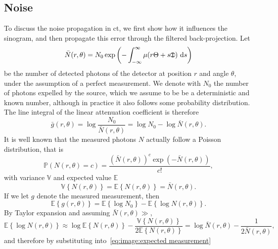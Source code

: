 \documentclass[../ml-ct.tex]{subfiles}
\begin{document}
\subsection{Noise}%
\label{ssec:image:artifacts:noise}
To discuss the noise propagation in \gls{ct}, we first show how it influences the sinogram, and then propagate this error through the filtered back-projection.
Let
\begin{equation}
	\bar{N}(r, \theta) = N_0 \exp{\left( -\int_{-\infty}^{\infty} \mu(r\tcs + s\tcsperp)\ \dd s \right)}
\end{equation}
be the number of detected photons of the detector at position \( r \) and angle \( \theta \), under the assumption of a perfect measurement.
We denote with \( N_0 \) the number of photons expelled by the source, which we assume to be be a deterministic and known number, although in practice it also follows some probability distribution.
The line integral of the linear attenuation coefficient is therefore
\begin{equation}
	\bar{g}(r, \theta) = \log \frac{N_0}{\bar{N}(r, \theta)} = \log N_0 - \log \bar{N}(r, \theta).
\end{equation}
It is well known that the measured photons \( N \) actually follow a Poisson distribution, that is
\begin{equation}
	\mathbb{P}(N(r, \theta) = c) = \frac{{(\bar{N}(r, \theta))}^c \exp{(-\bar{N}(r, \theta))}}{c!},
\end{equation}
with variance \( \mathbb{V} \) and expected value \( \mathbb{E} \)
\begin{equation}
	\mathbb{V}\left\{ N(r, \theta) \right\} = \mathbb{E}\left\{ N(r, \theta) \right\} = \bar{N}(r, \theta).
\end{equation}
If we let \( g \) denote the measured measurement, then
\begin{equation}
	\mathbb{E}\left\{ g(r, \theta) \right\} = \mathbb{E}\left\{ \log{N_0} \right\} - \mathbb{E}\left\{ \log{N(r, \theta)} \right\}.%
	\label{eq:image:expected measurement}
\end{equation}
By Taylor expansion and assuming \( \bar{N}(r, \theta ) \gg \),
\begin{equation}
	\mathbb{E} \left\{ \log{N(r, \theta)} \right\} \approx \log \mathbb{E} \left\{ N(r, \theta) \right\} - \frac{\mathbb{V}\left\{ N(r, \theta) \right\}}{2 \mathbb{E} \left\{ N(r, \theta) \right\}} = \log \bar{N}(r, \theta) - \frac{1}{2\bar{N}(r, \theta)},
\end{equation}
and therefore by substituting into~\cref{eq:image:expected measurement}
\end{document}
